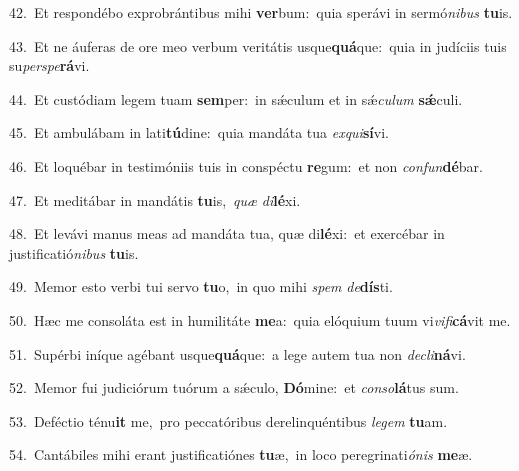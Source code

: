 {\numbfont\textcolor{\numbcolor}{42.}}~Et respondébo exprobrántibus mihi \textbf{ver}\-bum:~\star quia sperávi in sermó\-\textit{ni}\-\textit{bus} \textbf{tu}\-is.\par
{\numbfont\textcolor{\numbcolor}{43.}}~Et ne áuferas de ore meo verbum veritátis usque\-\textbf{quá}\-que:~\star quia in judíciis tuis su\-\textit{per}\-\textit{spe}\textbf{rá}vi.\par
{\numbfont\textcolor{\numbcolor}{44.}}~Et custódiam legem tuam \textbf{sem}\-per:~\star in sǽculum et in sǽ\-\textit{cu}\-\textit{lum} \textbf{sǽ}\-culi.\par
{\numbfont\textcolor{\numbcolor}{45.}}~Et ambulábam in lati\-\textbf{tú}\-dine:~\star quia mandáta tua \textit{ex}\-\textit{qui}\textbf{sí}vi.\par
{\numbfont\textcolor{\numbcolor}{46.}}~Et loquébar in testimóniis tuis in conspéctu \textbf{re}\-gum:~\star et non \textit{con}\-\textit{fun}\textbf{dé}bar.\par
{\numbfont\textcolor{\numbcolor}{47.}}~Et meditábar in mandátis \textbf{tu}\-is,~\star \textit{quæ} \textit{di}\-\textbf{lé}xi.\par
{\numbfont\textcolor{\numbcolor}{48.}}~Et levávi manus meas ad mandáta tua, quæ di\-\textbf{lé}\-xi:~\star et exercébar in justificatió\-\textit{ni}\-\textit{bus} \textbf{tu}\-is.\par
{\numbfont\textcolor{\numbcolor}{49.}}~Memor esto verbi tui servo \textbf{tu}\-o,~\star in quo mihi \textit{spem} \textit{de}\-\textbf{dís}ti.\par
{\numbfont\textcolor{\numbcolor}{50.}}~Hæc me consoláta est in humilitáte \textbf{me}\-a:~\star quia elóquium tuum vi\-\textit{vi}\-\textit{fi}\textbf{cá}vit me.\par
{\numbfont\textcolor{\numbcolor}{51.}}~Supérbi iníque agébant usque\-\textbf{quá}\-que:~\star a lege autem tua non \textit{de}\-\textit{cli}\textbf{ná}vi.\par
{\numbfont\textcolor{\numbcolor}{52.}}~Memor fui judiciórum tuórum a sǽculo, \textbf{Dó}\-mine:~\star et \textit{con}\-\textit{so}\textbf{lá}tus sum.\par
{\numbfont\textcolor{\numbcolor}{53.}}~Deféctio ténu\textbf{it} me,~\star pro peccatóribus derelinquéntibus \textit{le}\-\textit{gem} \textbf{tu}\-am.\par
{\numbfont\textcolor{\numbcolor}{54.}}~Cantábiles mihi erant justificatiónes \textbf{tu}\-æ,~\star in loco peregrinati\-\textit{ó}\-\textit{nis} \textbf{me}\-æ.\par
